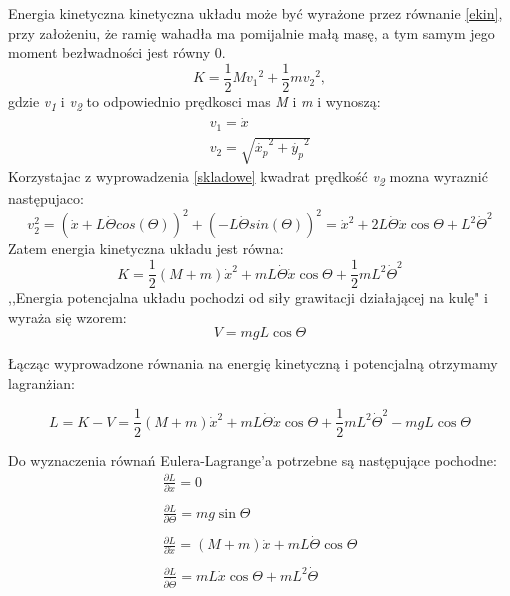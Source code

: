 Energia kinetyczna kinetyczna układu może być wyrażone przez równanie \ref{ekin}, przy założeniu, że ramię wahadła ma pomijalnie małą masę, a tym samym jego moment bezłwadności jest równy 0.
\begin{equation}
    K=\frac{1}{2}M{v_{1}}^{2}+\frac{1}{2}m{v_{2}}^{2},
    \label{ekin}
\end{equation}
gdzie \textit{v\textsubscript{1}} i \textit{v\textsubscript{2}} to odpowiednio prędkosci mas \textit{M} i \textit{m} i wynoszą:
\begin{equation}
    \begin{array}{l}
         v_1=\dot{x} \\
         v_2=\sqrt{\dot{x_p}^{2}+\dot{y_p}^{2}}
    \end{array}
\end{equation}
Korzystajac z wyprowadzenia \ref{skladowe} kwadrat prędkość \textit{v\textsubscript{2}} mozna wyraznić następujaco: 
\begin{equation}
    v_2^2=(\dot{x}+L\dot{\Theta}cos(\Theta))^{2}+(-L\dot{\Theta}sin(\Theta))^{2}=\dot{x}^2+2L\dot{\Theta}\dot{x}\cos{\Theta}+L^2\dot{\Theta}^2
\end{equation}
Zatem energia kinetyczna układu jest równa:
\begin{equation}
    K=\frac{1}{2}(M+m)\dot{x}^2+mL\dot{\Theta}\dot{x}\cos{\Theta}+\frac{1}{2}mL^2\dot{\Theta}^2
\end{equation}
,,Energia potencjalna układu pochodzi od siły grawitacji działającej na kulę" \cite{TchMu18} i wyraża się wzorem:
\begin{equation}
    V=mgL\cos{\Theta}
\end{equation}

Łącząc wyprowadzone równania na energię kinetyczną i potencjalną otrzymamy lagranżian:

\begin{equation}
    L=K-V=\frac{1}{2}(M+m)\dot{x}^2+mL\dot{\Theta}\dot{x}\cos{\Theta}+\frac{1}{2}mL^2\dot{\Theta}^2-mgL\cos{\Theta}
\end{equation}

Do wyznaczenia równań Eulera-Lagrange’a potrzebne są następujące pochodne:
\begin{equation}
        \begin{array}{l}
         \frac{\partial L}{\partial x}=0 \\ \\
         \frac{\partial L}{\partial \Theta}=mg\sin{\Theta} \\ \\
         \frac{\partial L}{\partial \dot{x}}=(M+m)\dot{x}+mL\dot{\Theta}\cos{\Theta} \\ \\
         \frac{\partial L}{\partial \dot{\Theta}}=mL\dot{x}\cos{\Theta}+mL^2\dot{\Theta}
    \end{array}
\end{equation}